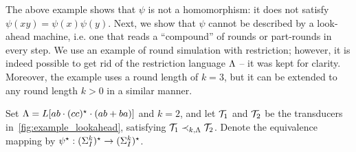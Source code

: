 The above example shows that $\psi$ is not a homomorphism: it does not satisfy $\psi(xy)=\psi(x)\psi(y)$. Next, we show that $\psi$ cannot be described by a look-ahead machine, i.e. one that reads a ``compound'' of rounds or part-rounds in every step. We use an example of round simulation with restriction; however, it is indeed possible to get rid of the restriction language $\Lambda$ -- it was kept for clarity. Moreover, the example uses a round length of $k=3$, but it can be extended to any round length $k>0$ in a similar manner.

\begin{example}
\label{example:lookahead}
Set $\Lambda=L[ab\cdot (cc)^\star\cdot (ab+ba)]$ and $k=2$, and let $\mathcal{T}_1$ and $\mathcal{T}_2$ be the transducers in~\cref{fig:example_lookahead}, satisfying $\mathcal{T}_1\prec_{k,\Lambda} \mathcal{T}_2$. Denote the equivalence mapping by $\psi^\star: (\Sigma_{I}^k)^\star \rightarrow (\Sigma_{I}^k)^\star$.


\end{example}
